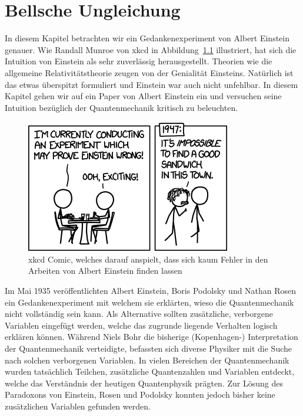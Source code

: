 \chapter{Bellsche Ungleichung\label{chapter:bell}}
\begin{refsection}

In diesem Kapitel betrachten wir ein Gedankenexperiment von Albert Einstein
genauer.
Wie Randall Munroe von xkcd in Abbildung~\ref{fig:bell:xkcd_einstein} illustriert,
hat sich die Intuition von Einstein als sehr zuverl\"assig herausgestellt.
Theorien wie die allgemeine Relativit\"atstheorie zeugen von der Genialit\"at
Einsteins.
Nat\"urlich ist das etwas \"uberspitzt formuliert und Einstein war auch nicht
unfehlbar.
In diesem Kapitel gehen wir auf ein Paper von Albert Einstein ein und versuchen
seine Intuition bez\"uglich der Quantenmechanik kritisch zu beleuchten.

\begin{figure}[b]
    \centering
    \includegraphics[width=0.5\linewidth]{bell/images/xkcd_einstein.png}
    \caption{xkcd Comic, welches darauf anspielt, dass sich kaum Fehler 
    in den Arbeiten von Albert Einstein finden lassen \cite{Bell:XkcdEinstein}}
    \label{fig:bell:xkcd_einstein}
\end{figure}

Im Mai 1935 ver\"offentlichten Albert Einstein, Boris Podolsky und
Nathan Rosen ein Gedankenexperiment mit welchem sie erkl\"arten, wieso
die Quantenmechanik nicht vollst\"andig sein kann. Als Alternative
sollten zus\"atzliche, verborgene Variablen eingef\"ugt werden, welche
das zugrunde liegende Verhalten logisch erkl\"aren k\"onnen.
W\"ahrend Niels Bohr die bisherige (Kopenhagen-) Interpretation der 
Quantenmechanik verteidigte, befassten sich diverse Physiker mit die Suche
nach solchen verborgenen Variablen.
In vielen Bereichen der Quantenmechanik wurden tats\"achlich
Teilchen, zus\"atzliche Quantenzahlen und Variablen entdeckt, welche
das Verst\"andnis der heutigen Quantenphysik pr\"agten.
Zur L\"osung des Paradoxons von Einstein, Rosen und Podolsky konnten
jedoch bisher keine zus\"atzlichen Variablen gefunden werden.


\end{refsection}
